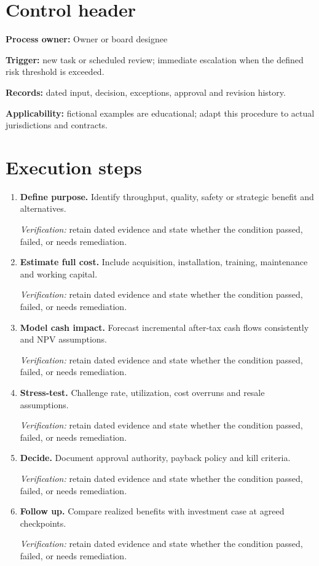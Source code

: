 \documentclass[11pt]{article}
\begin{document}
\SuiteOpen
\section{Control header}
\textbf{Process owner:} Owner or board designee\par\textbf{Trigger:} new task or scheduled review; immediate escalation when the defined risk threshold is exceeded.\par\textbf{Records:} dated input, decision, exceptions, approval and revision history.\par\textbf{Applicability:} fictional examples are educational; adapt this procedure to actual jurisdictions and contracts.
\section{Execution steps}
\begin{enumerate}[leftmargin=*,itemsep=8pt]
\item \textbf{Define purpose.} Identify throughput, quality, safety or strategic benefit and alternatives.\par\textit{Verification:} retain dated evidence and state whether the condition passed, failed, or needs remediation.
\item \textbf{Estimate full cost.} Include acquisition, installation, training, maintenance and working capital.\par\textit{Verification:} retain dated evidence and state whether the condition passed, failed, or needs remediation.
\item \textbf{Model cash impact.} Forecast incremental after-tax cash flows consistently and NPV assumptions.\par\textit{Verification:} retain dated evidence and state whether the condition passed, failed, or needs remediation.
\item \textbf{Stress-test.} Challenge rate, utilization, cost overruns and resale assumptions.\par\textit{Verification:} retain dated evidence and state whether the condition passed, failed, or needs remediation.
\item \textbf{Decide.} Document approval authority, payback policy and kill criteria.\par\textit{Verification:} retain dated evidence and state whether the condition passed, failed, or needs remediation.
\item \textbf{Follow up.} Compare realized benefits with investment case at agreed checkpoints.\par\textit{Verification:} retain dated evidence and state whether the condition passed, failed, or needs remediation.
\end{enumerate}
\end{document}
